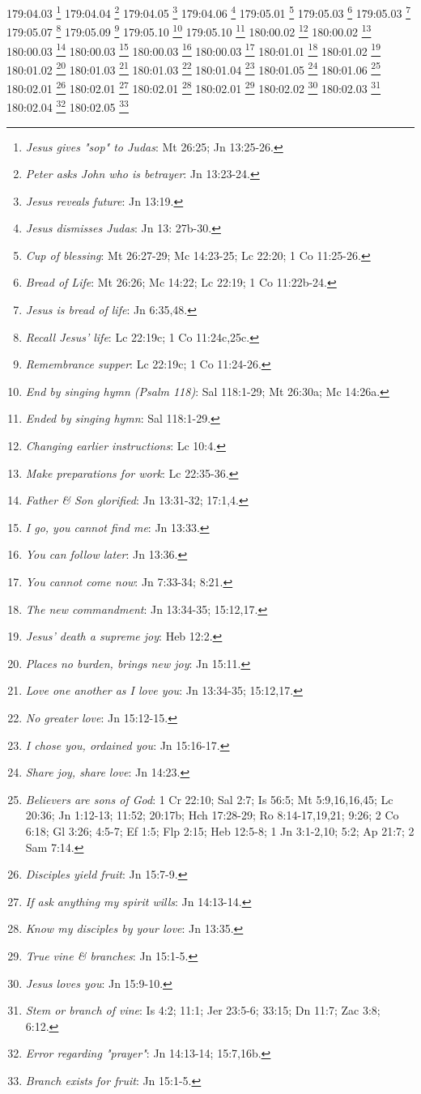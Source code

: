 179:04.03 \footnote{\textit{Jesus gives "sop" to Judas}: Mt 26:25; Jn 13:25-26.}
179:04.04 \footnote{\textit{Peter asks John who is betrayer}: Jn 13:23-24.}
179:04.05 \footnote{\textit{Jesus reveals future}: Jn 13:19.}
179:04.06 \footnote{\textit{Jesus dismisses Judas}: Jn 13: 27b-30.}
179:05.01 \footnote{\textit{Cup of blessing}: Mt 26:27-29; Mc 14:23-25; Lc 22:20; 1 Co 11:25-26.}
179:05.03 \footnote{\textit{Bread of Life}: Mt 26:26; Mc 14:22; Lc 22:19; 1 Co 11:22b-24.}
179:05.03 \footnote{\textit{Jesus is bread of life}: Jn 6:35,48.}
179:05.07 \footnote{\textit{Recall Jesus' life}: Lc 22:19c; 1 Co 11:24c,25c.}
179:05.09 \footnote{\textit{Remembrance supper}: Lc 22:19c; 1 Co 11:24-26.}
179:05.10 \footnote{\textit{End by singing hymn (Psalm 118)}: Sal 118:1-29; Mt 26:30a; Mc 14:26a.}
179:05.10 \footnote{\textit{Ended by singing hymn}: Sal 118:1-29.}
180:00.02 \footnote{\textit{Changing earlier instructions}: Lc 10:4.}
180:00.02 \footnote{\textit{Make preparations for work}: Lc 22:35-36.}
180:00.03 \footnote{\textit{Father & Son glorified}: Jn 13:31-32; 17:1,4.}
180:00.03 \footnote{\textit{I go, you cannot find me}: Jn 13:33.}
180:00.03 \footnote{\textit{You can follow later}: Jn 13:36.}
180:00.03 \footnote{\textit{You cannot come now}: Jn 7:33-34; 8:21.}
180:01.01 \footnote{\textit{The new commandment}: Jn 13:34-35; 15:12,17.}
180:01.02 \footnote{\textit{Jesus' death a supreme joy}: Heb 12:2.}
180:01.02 \footnote{\textit{Places no burden, brings new joy}: Jn 15:11.}
180:01.03 \footnote{\textit{Love one another as I love you}: Jn 13:34-35; 15:12,17.}
180:01.03 \footnote{\textit{No greater love}: Jn 15:12-15.}
180:01.04 \footnote{\textit{I chose you, ordained you}: Jn 15:16-17.}
180:01.05 \footnote{\textit{Share joy, share love}: Jn 14:23.}
180:01.06 \footnote{\textit{Believers are sons of God}: 1 Cr 22:10; Sal 2:7; Is 56:5; Mt 5:9,16,16,45; Lc 20:36; Jn 1:12-13; 11:52; 20:17b; Hch 17:28-29; Ro 8:14-17,19,21; 9:26; 2 Co 6:18; Gl 3:26; 4:5-7; Ef 1:5; Flp 2:15; Heb 12:5-8; 1 Jn 3:1-2,10; 5:2; Ap 21:7; 2 Sam 7:14.}
180:02.01 \footnote{\textit{Disciples yield fruit}: Jn 15:7-9.}
180:02.01 \footnote{\textit{If ask anything my spirit wills}: Jn 14:13-14.}
180:02.01 \footnote{\textit{Know my disciples by your love}: Jn 13:35.}
180:02.01 \footnote{\textit{True vine & branches}: Jn 15:1-5.}
180:02.02 \footnote{\textit{Jesus loves you}: Jn 15:9-10.}
180:02.03 \footnote{\textit{Stem or branch of vine}: Is 4:2; 11:1; Jer 23:5-6; 33:15; Dn 11:7; Zac 3:8; 6:12.}
180:02.04 \footnote{\textit{Error regarding "prayer"}: Jn 14:13-14; 15:7,16b.}
180:02.05 \footnote{\textit{Branch exists for fruit}: Jn 15:1-5.}
